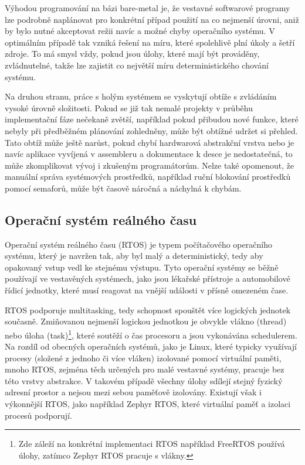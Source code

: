 Výhodou programování na bázi bare-metal je, že vestavné softwarové programy lze podrobně naplánovat pro konkrétní případ použití na co nejmenší úrovni, aniž by bylo nutné akceptovat režii navíc a možné chyby operačního systému. V optimálním případě tak vzniká řešení na míru, které spolehlivě plní úkoly a šetří zdroje. To má smysl vždy, pokud jsou úlohy, které mají být prováděny, zvládnutelné, takže lze zajistit co největší míru deterministického chování systému. \cite{sysgo_baremetal_vs_rtos}

Na druhou stranu, práce s holým systémem se vyskytují obtíže s zvládáním vysoké úrovně složitosti. Pokud se již tak nemalé projekty v průběhu implementační fáze nečekaně zvětší, například pokud přibudou nové funkce, které nebyly při předběžném plánování zohledněny, může být obtížné udržet si přehled. Tato obtíž může ještě narůst, pokud chybí hardwarová abstrakční vrstva nebo je navíc aplikace vyvíjená v assembleru a dokumentace k desce je nedostatečná, to může zkomplikovat vývoj i zkušeným programátorům. Nelze také opomenout, že manuální správa systémových prostředků, například ruční blokování prostředků pomocí semaforů, může být časově náročná a náchylná k chybám. \cite{sysgo_baremetal_vs_rtos}

\subsection{Operační systém reálného času}
Operační systém reálného času (RTOS) je typem počítačového operačního systému, který je navržen tak, aby byl malý a deterministický, tedy aby opakovaný vstup vedl ke stejnému výstupu. Tyto operační systémy se běžně používají ve vestavěných systémech, jako jsou lékařské přístroje a automobilové řídicí jednotky, které musí reagovat na vnější události v přísně omezeném čase. \cite{freertos_what_is_rtos}

RTOS podporuje multitasking, tedy schopnost spouštět více logických jednotek současně. Zmiňovanou nejmenší logickou jednotkou je obvykle vlákno (thread) nebo úloha (task)\footnote{Zde záleží na konkrétní implementaci RTOS například FreeRTOS používá úlohy, zatímco Zephyr RTOS pracuje s vlákny.}, které soutěží o čas procesoru a jsou vykonávána schedulerem. Na rozdíl od obecných operačních systémů, jako je Linux, které typicky využívají procesy (složené z jednoho či více vláken) izolované pomocí virtuální paměti, mnoho RTOS, zejména těch určených pro malé vestavné systémy, pracuje bez této vrstvy abstrakce. V takovém případě všechny úlohy sdílejí stejný fyzický adresní prostor a nejsou mezi sebou paměťově izolovány. Existují však i výkonnější RTOS, jako například Zephyr RTOS, které virtuální paměť a izolaci procesů podporují. \cite{freertos_what_is_rtos}

